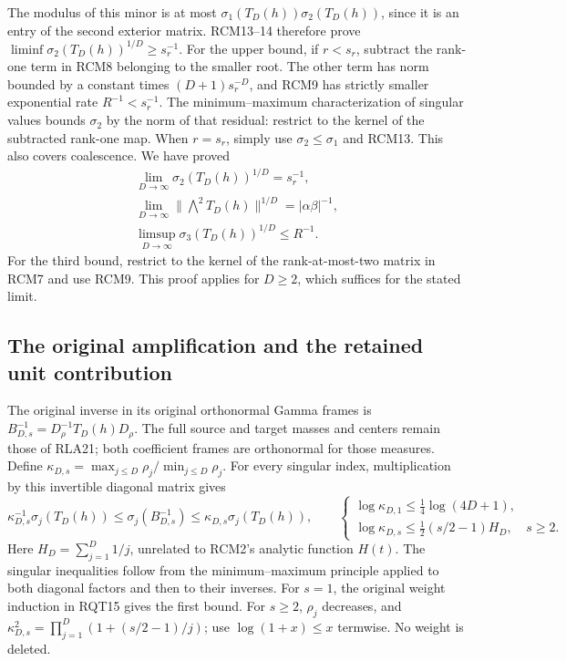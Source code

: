 The modulus of this minor is at most
$\sigma_1(T_D(h))\sigma_2(T_D(h))$, since it is an entry
of the second exterior matrix.  RCM13--14 therefore prove
$\liminf\sigma_2(T_D(h))^{1/D}\ge s_r^{-1}$.
For the upper bound, if $r<s_r$, subtract the rank-one term
in RCM8 belonging to the smaller root.  The other term has
norm bounded by a constant times $(D+1)s_r^{-D}$, and RCM9
has strictly smaller exponential rate $R^{-1}<s_r^{-1}$.
The minimum--maximum characterization of singular values bounds
$\sigma_2$ by the norm of that residual: restrict to the kernel
of the subtracted rank-one map.  When $r=s_r$, simply use
$\sigma_2\le\sigma_1$ and RCM13.  This also covers coalescence.
We have proved
\[
 \begin{gathered}
 \lim_{D\to\infty}\sigma_2(T_D(h))^{1/D}=s_r^{-1},\\
 \lim_{D\to\infty}\|\bigwedge^2T_D(h)\|^{1/D}
          =|\alpha\beta|^{-1},\\
 \limsup_{D\to\infty}\sigma_3(T_D(h))^{1/D}\le R^{-1}.
 \end{gathered}\tag{RCM15}
\]
For the third bound, restrict to the kernel of the rank-at-most-two
matrix in RCM7 and use RCM9.  This proof applies for $D\ge2$,
which suffices for the stated limit.

\subsection{The original amplification and the retained unit contribution}
The original inverse in its original orthonormal Gamma frames is
$B_{D,s}^{-1}=D_\rho^{-1}T_D(h)D_\rho$.
The full source and target masses and centers remain those of
RLA21; both coefficient frames are orthonormal for those measures.
Define $\kappa_{D,s}=\max_{j\le D}\rho_j/\min_{j\le D}\rho_j$.
For every singular index, multiplication by this invertible
diagonal matrix gives
\[
 \kappa_{D,s}^{-1}\sigma_j(T_D(h))\le
 \sigma_j(B_{D,s}^{-1})\le
 \kappa_{D,s}\sigma_j(T_D(h)),\qquad
 \begin{cases}
 \log\kappa_{D,1}\le\tfrac14\log(4D+1),\\
 \log\kappa_{D,s}\le\tfrac12(s/2-1)H_D,&s\ge2.
 \end{cases}
 \tag{RCM16}
\]
Here $H_D=\sum_{j=1}^D1/j$, unrelated to RCM2's analytic
function $H(t)$.  The singular inequalities follow from the
minimum--maximum principle applied to both diagonal factors
and then to their inverses.  For $s=1$, the original weight
induction in RQT15 gives the first bound.  For $s\ge2$,
$\rho_j$ decreases, and
$\kappa_{D,s}^2=\prod_{j=1}^D(1+(s/2-1)/j)$;
use $\log(1+x)\le x$ termwise.  No weight is deleted.

